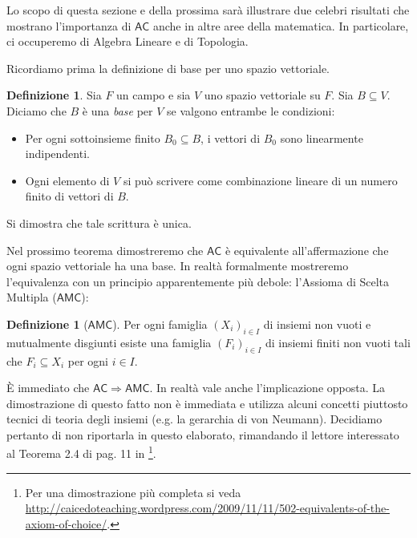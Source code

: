 \documentclass[12pt,a4paper]{report}
\theoremstyle{definition}
\newtheorem{defn}[teo]{Definizione}  %
\theoremstyle{num.custom-title}
\DeclareMathOperator{\imp}{\Rightarrow}
\DeclareMathOperator{\sse}{\subseteq}
\newcommand{\AC}{\ensuremath{\mathsf{AC}}\xspace}
\newcommand{\AMC}{\ensuremath{\mathsf{AMC}}\xspace}
\begin{document}
Lo scopo di questa sezione e della prossima sarà illustrare due celebri risultati che mostrano l'importanza di \AC anche in altre aree della matematica. In particolare, ci occuperemo di Algebra Lineare e di Topologia.

Ricordiamo prima la definizione di base per uno spazio vettoriale.

\begin{defn}
Sia $F$ un campo e sia $V$ uno spazio vettoriale su $F$. Sia $B \subseteq V$. Diciamo che $B$ è una \emph{base} per $V$ se valgono entrambe le condizioni:
\begin{itemize}
\item Per ogni sottoinsieme finito $B_0 \subseteq B$, i vettori di $B_0$ sono linearmente indipendenti.
\item Ogni elemento di $V$ si può scrivere come combinazione lineare di un numero finito di vettori di $B$.
\end{itemize}
Si dimostra che tale scrittura è unica.
\end{defn}

Nel prossimo teorema dimostreremo che \AC è equivalente all'affermazione che ogni spazio vettoriale ha una base. In realtà formalmente mostreremo l'equivalenza con un principio apparentemente più debole: l'Assioma di Scelta Multipla (\AMC):

\begin{defn}[\AMC]
Per ogni famiglia $(X_i)_{i \in I}$ di insiemi non vuoti e mutualmente disgiunti esiste una famiglia $(F_i)_{i \in I}$ di insiemi finiti non vuoti tali che $F_i \sse X_i$ per ogni $i \in I$.
\end{defn}

È immediato che $\AC \imp \AMC$. In realtà vale anche l'implicazione opposta. La dimostrazione di questo fatto non è immediata e utilizza alcuni concetti piuttosto tecnici di teoria degli insiemi (e.g. la gerarchia di von Neumann). Decidiamo pertanto di non riportarla in questo elaborato, rimandando il lettore interessato al Teorema 2.4 di pag. 11 in \cite{Herrlich:Herrlich}\footnote{Per una dimostrazione più completa si veda \url{http://caicedoteaching.wordpress.com/2009/11/11/502-equivalents-of-the-axiom-of-choice/}.}.
\end{document}
